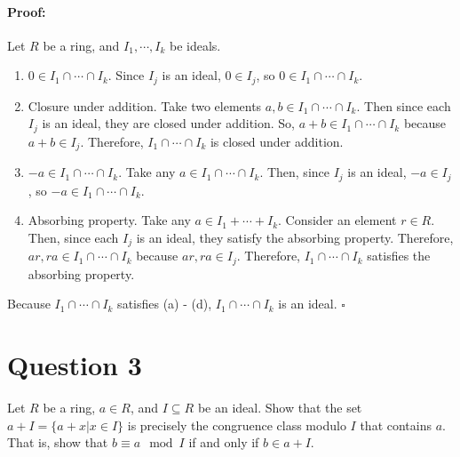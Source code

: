\documentclass [12pt] {article}
\newenvironment{proof}{\paragraph{Proof:}}{\hfill$\square$}
\begin{document}
\begin{enumerate}
        \vspace{-1.5em}
        \begin{proof}
            Let $R$ be a ring, and $I_1, \cdots, I_k$ be ideals.
            \begin{enumerate}
                \item $0 \in I_1 \cap \cdots \cap I_k$. Since $I_j$ is an ideal, $0 \in I_j$, so 
                    $0 \in I_1 \cap \cdots \cap I_k$.
                \item Closure under addition. Take two elements $a, b \in I_1 \cap \cdots \cap I_k$. 
                    Then since each $I_j$ is an ideal, they are closed under addition. So, 
                    $a + b \in I_1 \cap \cdots \cap I_k$ because $a + b \in I_j$. Therefore, 
                    $I_1 \cap \cdots \cap I_k$ is closed under addition.
                \item $-a \in I_1 \cap \cdots \cap I_k$. Take any $a \in I_1 \cap \cdots \cap I_k$. 
                    Then, since $I_j$ is an ideal, $-a \in I_j$, so $-a \in I_1 \cap \cdots \cap I_k$.
                \item Absorbing property. Take any $a \in I_1 + \cdots + I_k$. Consider an element 
                    $r \in R$. Then, since each $I_j$ is an ideal, they satisfy the absorbing
                    property. Therefore, $ar, ra \in I_1 \cap \cdots \cap I_k$ because 
                    $ar, ra \in I_j$. Therefore, $I_1 \cap \cdots \cap I_k$ satisfies the absorbing
                    property.
            \end{enumerate}
            Because $I_1 \cap \cdots \cap I_k$ satisfies (a) - (d), $I_1 \cap \cdots \cap I_k$ is an ideal.
        \end{proof}
\end{enumerate}
\newpage

\section*{Question 3}
Let $R$ be a ring, $a\in R$, and $I\subseteq R$ be an ideal. Show that the set $a+I=\{a+x|x\in I\}$ is precisely the congruence class modulo $I$ that contains $a$. That is, show that $b\equiv a\mod I$ if and only if $b\in a+I$. 
\end{document}

